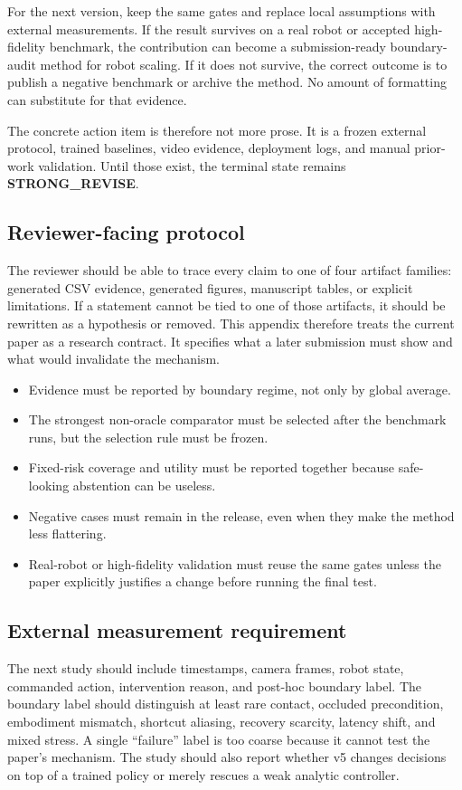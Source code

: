 \documentclass{article}
\begin{document}
For the next version, keep the same gates and replace local assumptions with external measurements. If the result survives on a real robot or accepted high-fidelity benchmark, the contribution can become a submission-ready boundary-audit method for robot scaling. If it does not survive, the correct outcome is to publish a negative benchmark or archive the method. No amount of formatting can substitute for that evidence.

The concrete action item is therefore not more prose. It is a frozen external protocol, trained baselines, video evidence, deployment logs, and manual prior-work validation. Until those exist, the terminal state remains \textbf{STRONG\_REVISE}.

\subsection{Reviewer-facing protocol}
The reviewer should be able to trace every claim to one of four artifact families: generated CSV evidence, generated figures, manuscript tables, or explicit limitations. If a statement cannot be tied to one of those artifacts, it should be rewritten as a hypothesis or removed. This appendix therefore treats the current paper as a research contract. It specifies what a later submission must show and what would invalidate the mechanism.

\begin{itemize}
\item Evidence must be reported by boundary regime, not only by global average.
\item The strongest non-oracle comparator must be selected after the benchmark runs, but the selection rule must be frozen.
\item Fixed-risk coverage and utility must be reported together because safe-looking abstention can be useless.
\item Negative cases must remain in the release, even when they make the method less flattering.
\item Real-robot or high-fidelity validation must reuse the same gates unless the paper explicitly justifies a change before running the final test.
\end{itemize}

\subsection{External measurement requirement}
The next study should include timestamps, camera frames, robot state, commanded action, intervention reason, and post-hoc boundary label. The boundary label should distinguish at least rare contact, occluded precondition, embodiment mismatch, shortcut aliasing, recovery scarcity, latency shift, and mixed stress. A single ``failure'' label is too coarse because it cannot test the paper's mechanism. The study should also report whether v5 changes decisions on top of a trained policy or merely rescues a weak analytic controller.
\end{document}
